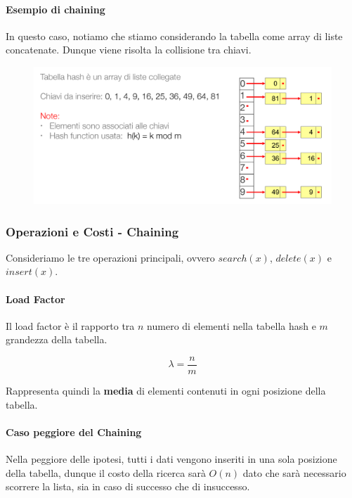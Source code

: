 \documentclass{article}
\begin{document}
\newpage

\paragraph{Esempio di chaining} In questo caso, notiamo che stiamo considerando la tabella come array di liste concatenate. Dunque viene risolta la collisione tra chiavi.

\begin{figure}[htbp]
        \center
        \includegraphics[scale=0.35]{img/chaining1.png}
    \end{figure}

\subsubsection{Operazioni e Costi - Chaining} Consideriamo le tre operazioni principali, ovvero $search(x)$, $delete(x)$ e $insert(x)$.

\paragraph{Load Factor} Il load factor è il rapporto tra $n$ numero di elementi nella tabella hash e $m$ grandezza della tabella.

\begin{equation}
    \lambda=\frac{n}{m}
\end{equation}

Rappresenta quindi la \textbf{media} di elementi contenuti in ogni posizione della tabella.

\paragraph{Caso peggiore del Chaining} Nella peggiore delle ipotesi, tutti i dati vengono inseriti in una sola posizione della tabella, dunque il costo della ricerca sarà $O(n)$ dato che sarà necessario scorrere la lista, sia in caso di successo che di insuccesso. 
\end{document}
